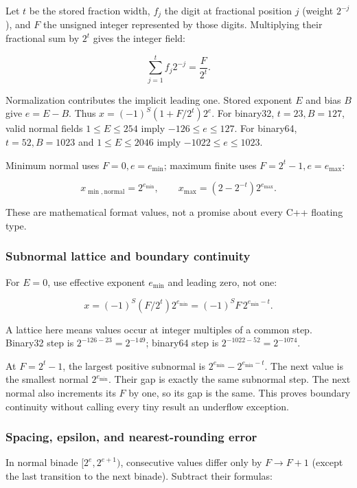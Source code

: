 Let \(t\) be the stored fraction width, \(f_j\) the digit at fractional position \(j\) (weight \(2^{-j}\)), and \(F\) the unsigned integer represented by those digits. Multiplying their fractional sum by \(2^t\) gives the integer field:

\[
\sum_{j=1}^{t}f_j2^{-j}=\frac{F}{2^t}.
\]

Normalization contributes the implicit leading one. Stored exponent \(E\) and bias \(B\) give \(e=E-B\). Thus \(x=(-1)^S(1+F/2^t)2^e\). For binary32, \(t=23,B=127\), valid normal fields \(1\le E\le254\) imply \(-126\le e\le127\). For binary64, \(t=52,B=1023\) and \(1\le E\le2046\) imply \(-1022\le e\le1023\).

Minimum normal uses \(F=0,e=e_{\min}\); maximum finite uses \(F=2^t-1,e=e_{\max}\):

\[
x_{\min,\mathrm{normal}}=2^{e_{\min}},\qquad
x_{\max}=(2-2^{-t})2^{e_{\max}}.
\]

These are mathematical format values, not a promise about every C++ floating type.

\subsubsection{Subnormal lattice and boundary continuity}\label{subnormal-lattice-and-boundary-continuity}

For \(E=0\), use effective exponent \(e_{\min}\) and leading zero, not one:

\[
x=(-1)^S(F/2^t)2^{e_{\min}}=(-1)^S F\,2^{e_{\min}-t}.
\]

A lattice here means values occur at integer multiples of a common step. Binary32 step is \(2^{-126-23}=2^{-149}\); binary64 step is \(2^{-1022-52}=2^{-1074}\).

At \(F=2^t-1\), the largest positive subnormal is \(2^{e_{\min}}-2^{e_{\min}-t}\). The next value is the smallest normal \(2^{e_{\min}}\). Their gap is exactly the same subnormal step. The next normal also increments its \(F\) by one, so its gap is the same. This proves boundary continuity without calling every tiny result an underflow exception.

\subsubsection{Spacing, epsilon, and nearest-rounding error}\label{spacing-epsilon-and-nearest-rounding-error}

In normal binade \([2^e,2^{e+1})\), consecutive values differ only by \(F\to F+1\) (except the last transition to the next binade). Subtract their formulas:

